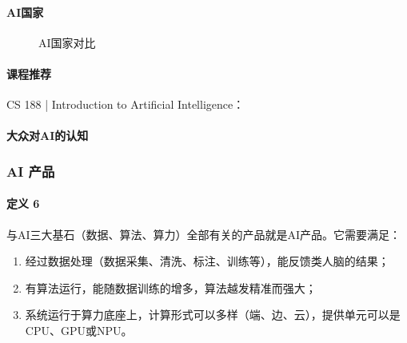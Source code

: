 \documentclass[letterpaper,10pt,english]{sphinxmanual}
\begin{document}
\paragraph{AI国家}
\label{\detokenize{chapter_introduction/AI:id30}}
\begin{figure}[H]
\centering
\capstart

\noindent{}
\caption{AI国家对比\sphinxfootnotemark[240]}\label{\detokenize{chapter_introduction/AI:id42}}\end{figure}
%
\begin{footnotetext}[240]\sphinxAtStartFootnote
{}
%
\end{footnotetext}\ignorespaces 

\paragraph{课程推荐}
\label{\detokenize{chapter_introduction/AI:id31}}
CS 188 | Introduction to Artificial
Intelligence：



\paragraph{大众对AI的认知}
\label{\detokenize{chapter_introduction/AI:id32}}


\subsubsection{AI 产品}
\label{\detokenize{chapter_introduction/AI_Product:ai}}\label{\detokenize{chapter_introduction/AI_Product::doc}}

\paragraph{定义 6\sphinxfootnotemark[241]}
\label{\detokenize{chapter_introduction/AI_Product:id1}}%
\begin{footnotetext}[241]\sphinxAtStartFootnote
{}
%
\end{footnotetext}\ignorespaces 
与AI三大基石（数据、算法、算力）全部有关的产品就是AI产品。它需要满足：
\begin{enumerate}
%
\item {} 
经过数据处理（数据采集、清洗、标注、训练等），能反馈类人脑的结果；

\item {} 
有算法运行，能随数据训练的增多，算法越发精准而强大；

\item {} 
系统运行于算力底座上，计算形式可以多样（端、边、云），提供单元可以是CPU、GPU或NPU。

\end{enumerate}
\end{document}
